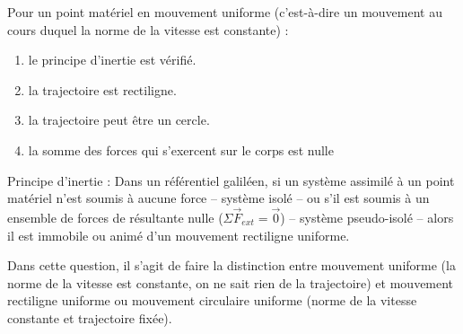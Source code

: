\documentclass[avery5371]{flashcards}
\begin{document}
\begin{flashcard}[]{
\color{black}
\vspace{0.15\cardheight}
\RaggedRight
Pour un point matériel en mouvement uniforme (c'est-à-dire un mouvement au cours duquel la norme de la vitesse est constante) :
\begin{enumerate}
    \item le principe d'inertie est vérifié.
    \item la trajectoire est rectiligne.
    \item la trajectoire peut être un cercle.
    \item la somme des forces qui s'exercent sur le corps est nulle
\end{enumerate}
}
\color{white}


\vspace{0.09\cardheight}
\RaggedRight

Principe d'inertie : Dans un référentiel galiléen, si un système assimilé à un point matériel n'est soumis à aucune force – système isolé – ou s'il est soumis à un ensemble de forces de résultante nulle ($\Sigma\vec{F}_{ext}=\vec{0}$) – système pseudo-isolé – alors il est immobile ou animé d'un mouvement rectiligne uniforme.

Dans cette question, il s'agit de faire la distinction entre mouvement uniforme (la norme de la vitesse est constante, on ne sait rien de la trajectoire) et mouvement rectiligne uniforme ou mouvement circulaire uniforme (norme de la vitesse constante et trajectoire fixée).

\end{flashcard}
\end{document}
